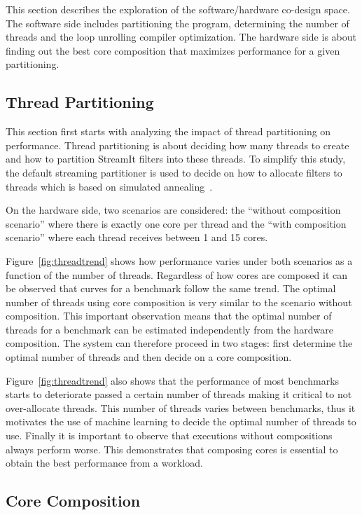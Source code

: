This section describes the exploration of the software/hardware co-design space.
The software side includes partitioning the program, determining the number of threads and the loop unrolling compiler optimization.
The hardware side is about finding out the best core composition that maximizes performance for a given partitioning.

\subsection{Thread Partitioning}

This section first starts with analyzing the impact of thread partitioning on performance.
Thread partitioning is about deciding how many threads to create and how to partition StreamIt filters into these threads.
To simplify this study, the default streaming partitioner is used to decide on how to allocate filters to threads which is based on simulated annealing~\cite{simulatedAnnealing1983}.

On the hardware side, two scenarios are considered:
the ``without composition scenario'' where there is exactly one core per thread and the ``with composition scenario'' where each thread receives between 1 and 15 cores.

Figure~\ref{fig:threadtrend} shows how performance varies under both scenarios as a function of the number of threads.
Regardless of how cores are composed it can be observed that curves for a benchmark follow the same trend.
The optimal number of threads using core composition is very similar to the scenario without composition.
This important observation means that the optimal number of threads for a benchmark can be estimated independently from the hardware composition.
The system can therefore proceed in two stages: first determine the optimal number of threads and then decide on a core composition.

Figure~\ref{fig:threadtrend} also shows that the performance of most benchmarks starts to deteriorate passed a certain number of threads making it critical to not over-allocate threads.
This number of threads varies between benchmarks, thus it motivates the use of machine learning to decide the optimal number of threads to use.
Finally it is important to observe that executions without compositions always perform worse.
This demonstrates that composing cores is essential to obtain the best performance from a workload.


\subsection{Core Composition}

